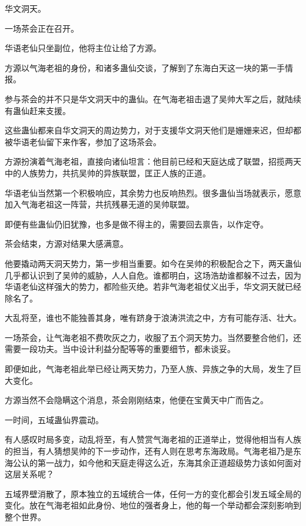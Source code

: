 
\begin{this_body}

华文洞天。

一场茶会正在召开。

华语老仙只坐副位，他将主位让给了方源。

方源以气海老祖的身份，和诸多蛊仙交谈，了解到了东海白天这一块的第一手情报。

参与茶会的并不只是华文洞天中的蛊仙。在气海老祖击退了吴帅大军之后，就陆续有蛊仙赶来支援。

这些蛊仙都来自华文洞天的周边势力，对于支援华文洞天他们是姗姗来迟，但却都被华语老仙留下来作客，参加了这场茶会。

方源扮演着气海老祖，直接向诸仙坦言：他目前已经和天庭达成了联盟，招揽两天中的人族势力，共抗吴帅的异族联盟，匡正人族的正道。

华语老仙当然第一个积极响应，其余势力也反响热烈。很多蛊仙当场就表示，愿意加入气海老祖这一阵营，共抗残暴无道的吴帅联盟。

即便有些蛊仙仍旧犹豫，也多是做不得主的，需要回去禀告，以作定夺。

茶会结束，方源对结果大感满意。

他要撬动两天洞天势力，第一步相当重要。如今在吴帅的积极配合之下，两天蛊仙几乎都认识到了吴帅的威胁，人人自危。谁都明白，这场浩劫谁都躲不过去，因为华语老仙这样强大的势力，都险些灭绝。若非气海老祖仗义出手，华文洞天就已经除名了。

大乱将至，谁也不能独善其身，唯有跻身于浪涛洪流之中，方有可能存活、壮大。

一场茶会，让气海老祖不费吹灰之力，收服了五个洞天势力。当然要整合他们，还需要一段功夫。当中设计利益分配等等的重要细节，都未谈妥。

即便如此，气海老祖此举已经让两天势力，乃至人族、异族之争的大局，发生了巨大变化。

方源当然不会隐瞒这个消息，茶会刚刚结束，他便在宝黄天中广而告之。

一时间，五域蛊仙界震动。

有人感叹时局多变，动乱将至，有人赞赏气海老祖的正道举止，觉得他相当有人族的担当，有人猜想吴帅的下一步动作，还有人则在思考东海政局。气海老祖乃是东海公认的第一战力，如今他和天庭走得这么近，东海其余正道超级势力该如何面对这层关系呢？

五域界壁消散了，原本独立的五域统合一体，任何一方的变化都会引发五域全局的变化。放在气海老祖如此身份、地位的强者身上，他的每一个举动都会深刻影响到整个世界。


\end{this_body}
